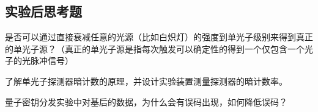 \documentclass[dvipsnames, svgnames,a4paper,11pt]{article}
\begin{document}
	
\subsection{实验后思考题}

\begin{question}
	是否可以通过直接衰减任意的光源（比如白炽灯）的强度到单光子级别来得到真正的单光子源？（真正的单光子源是指每次触发可以确定性的得到一个仅包含一个光子的光脉冲信号）
\end{question}









\begin{question}
	了解单光子探测器暗计数的原理，并设计实验装置测量探测器的暗计数率。
\end{question}









\begin{question}
	量子密钥分发实验中对基后的数据，为什么会有误码出现，如何降低误码？
\end{question}
\end{document}

